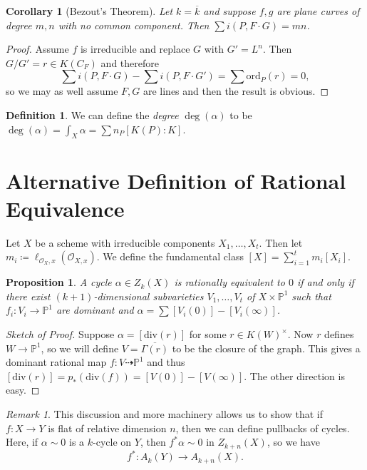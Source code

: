 \documentclass[leqno, openany]{memoir}
\newtheorem{cor}[thm]{Corollary}
\newtheorem{prop}[thm]{Proposition}
\theoremstyle{definition}
\newtheorem{defn}[thm]{Definition}
\theoremstyle{remark}
\newtheorem{rmk}[thm]{Remark}
\theoremstyle{plain}
\theoremstyle{definition}
\theoremstyle{remark}
\renewcommand{\P}{\mathbb{P}}
\newcommand{\mc}[1]{\mathcal{#1}}
\newcommand{\mr}[1]{\mathrm{#1}}
\newcommand{\ol}[1]{\overline{#1}}
\begin{document}
\begin{cor}[Bezout's Theorem] Let $k = \ol{k}$ and suppose $f,g$ are plane
curves of degree $m,n$ with no common component. Then $\sum i(P, F \cdot G) =
mn$.  \end{cor}

\begin{proof} Assume $f$ is irreducible and replace $G$ with $G' = L^n$. Then
    $G/G' = r \in K(C_F)$ and therefore \[ \sum i(P, F \cdot G) - \sum i(P, F
    \cdot G') = \sum \mr{ord}_P(r) = 0, \] so we may as well assume $F,G$ are
    lines and then the result is obvious.  \end{proof}

\begin{defn} We can define the \textit{degree} $\deg(\alpha)$ to be $\deg
(\alpha) = \int_X \alpha = \sum n_P [K(P) : K]$.  \end{defn}

\section{Alternative Definition of Rational Equivalence}%
\label{sec:alternative_definition_of_rational_equivalence}

Let $X$ be a scheme with irreducible components $X_1, \ldots, X_t$. Then let
$m_i \coloneqq \ell_{\mc{O}_X,x} (\mc{O}_{X,x})$. We define the fundamental
class $[X] = \sum_{i=1}^t m_i [X_i]$.

\begin{prop} A cycle $\alpha \in Z_k(X)$ is rationally equivalent to $0$ if and
    only if there exist $(k+1)$-dimensional subvarieties $V_1, \ldots, V_t$ of
    $X \times \P^1$ such that $f_i \colon V_i \to \P^1$ are dominant and
    $\alpha = \sum [V_i(0)] - [V_i(\infty)]$.  \end{prop}

\begin{proof}[Sketch of Proof] Suppose $\alpha = [\mr{div}(r)]$ for some $r \in
    {K(W)}^{\times}$. Now $r$ defines $W \to \P^1$, so we will define $V =
    \ol{\Gamma(r)}$ to be the closure of the graph. This gives a dominant
    rational map $f \colon V \dashrightarrow \P^1$ and thus $[\mr{div}(r)] =
    p_*(\mr{div}(f)) = [V(0)] - [V(\infty)]$. The other direction is easy.
\end{proof}

\begin{rmk} This discussion and more machinery allows us to show that if $f
    \colon X \to Y$ is flat of relative dimension $n$, then we can define
    pullbacks of cycles. Here, if $\alpha \sim 0$ is a $k$-cycle on $Y$, then
    $f^* \alpha \sim 0$ in $Z_{k+n}(X)$, so we have \[ f^* \colon A_k (Y) \to
    A_{k+n}(X). \] \end{rmk}
\end{document}
